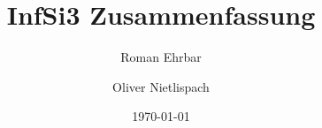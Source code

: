 \documentclass[10pt,a4paper]{article}
\title{InfSi3 Zusammenfassung}
\author{
	Roman Ehrbar\\
	\and
	Oliver Nietlispach
	}
\date{\today}
\begin{document}
\maketitle
\tableofcontents
\listoftodos
\newpage 




















\end{document}
